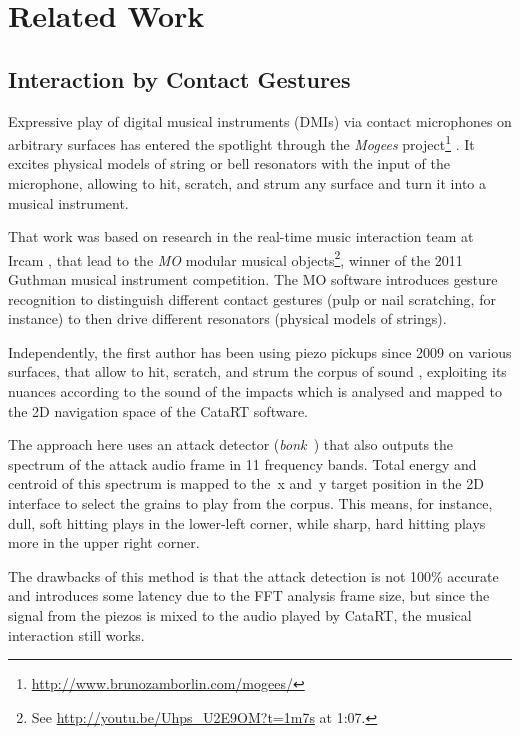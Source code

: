 \section{Related Work}\label{sec:related}

\subsection{Interaction by Contact Gestures}

Expressive play of digital musical instruments (DMIs) via contact microphones on arbitrary surfaces has entered the spotlight through the \textit{Mogees} project\footnote{\url{http://www.brunozamborlin.com/mogees/}}  \cite{Zamborlin14a}.  It excites physical models of string or bell resonators with the input of the microphone, allowing to hit, scratch, and strum any surface and turn it into a musical instrument.  

That work was based on research in the real-time music interaction team at Ircam \cite{Rasamimanana11a,Bevilacqua11b}, that lead to the \textit{MO} modular musical objects\footnote{See \url{http://youtu.be/Uhps_U2E9OM?t=1m7s} at 1:07.}, winner of the 2011 Guthman musical instrument competition.
The MO software introduces gesture recognition to distinguish different contact gestures (pulp or nail scratching, for instance) to then drive different resonators (physical models of strings).

Independently, the first author has been using piezo pickups since 2009 on various surfaces, that allow to hit, scratch, and strum the corpus of sound \cite{Schwarz-nime2012-sound-space}, exploiting
its nuances according to the sound of the impacts which is analysed and mapped to
the 2D navigation space of the CataRT software.

The approach here uses an attack detector (\textit{bonk~}) that also outputs the spectrum of the
attack audio frame in 11 frequency bands.  Total energy and centroid of this spectrum is mapped to
the~x and~y target position in the 2D interface to select the grains to play from the corpus.
This means, for instance, dull, soft hitting plays in the lower-left corner, while sharp, hard hitting plays more in the upper right corner.

The drawbacks of this method is that the attack detection is not 100\% accurate and introduces some latency due to the FFT analysis frame size, but since the signal from the piezos is mixed to the
audio played by CataRT, the musical interaction still works.

